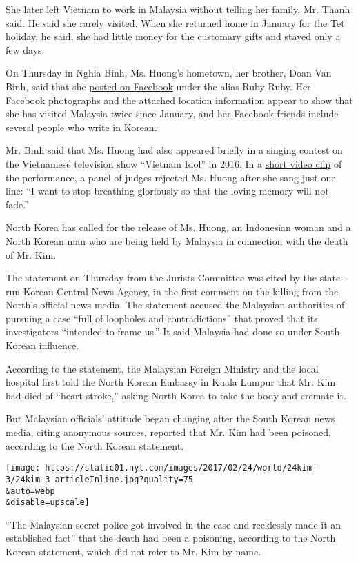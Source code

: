 She later left Vietnam to work in Malaysia without telling her family,
Mr. Thanh said. He said she rarely visited. When she returned home in
January for the Tet holiday, he said, she had little money for the
customary gifts and stayed only a few days.

On Thursday in Nghia Binh, Ms. Huong's hometown, her brother, Doan Van
Binh, said that she
\href{https://www.facebook.com/profile.php?id=100014435959215\&lst=698293796\%253A100014435959215\%253A1487826179}{posted
on Facebook} under the alias Ruby Ruby. Her Facebook photographs and the
attached location information appear to show that she has visited
Malaysia twice since January, and her Facebook friends include several
people who write in Korean.

Mr. Binh said that Ms. Huong had also appeared briefly in a singing
contest on the Vietnamese television show ``Vietnam Idol'' in 2016. In a
\href{http://www.youtube.com/watch?v=vZNqVandYLA}{short video clip} of
the performance, a panel of judges rejected Ms. Huong after she sang
just one line: ``I want to stop breathing gloriously so that the loving
memory will not fade.''

North Korea has called for the release of Ms. Huong, an Indonesian woman
and a North Korean man who are being held by Malaysia in connection with
the death of Mr. Kim.

The statement on Thursday from the Jurists Committee was cited by the
state-run Korean Central News Agency, in the first comment on the
killing from the North's official news media. The statement accused the
Malaysian authorities of pursuing a case ``full of loopholes and
contradictions'' that proved that its investigators ``intended to frame
us.'' It said Malaysia had done so under South Korean influence.

According to the statement, the Malaysian Foreign Ministry and the local
hospital first told the North Korean Embassy in Kuala Lumpur that Mr.
Kim had died of ``heart stroke,'' asking North Korea to take the body
and cremate it.

But Malaysian officials' attitude began changing after the South Korean
news media, citing anonymous sources, reported that Mr. Kim had been
poisoned, according to the North Korean statement.

\texttt{[image: https://static01.nyt.com/images/2017/02/24/world/24kim-3/24kim-3-articleInline.jpg?quality=75\\\&auto=webp\\\&disable=upscale]}

``The Malaysian secret police got involved in the case and recklessly
made it an established fact'' that the death had been a poisoning,
according to the North Korean statement, which did not refer to Mr. Kim
by name.

